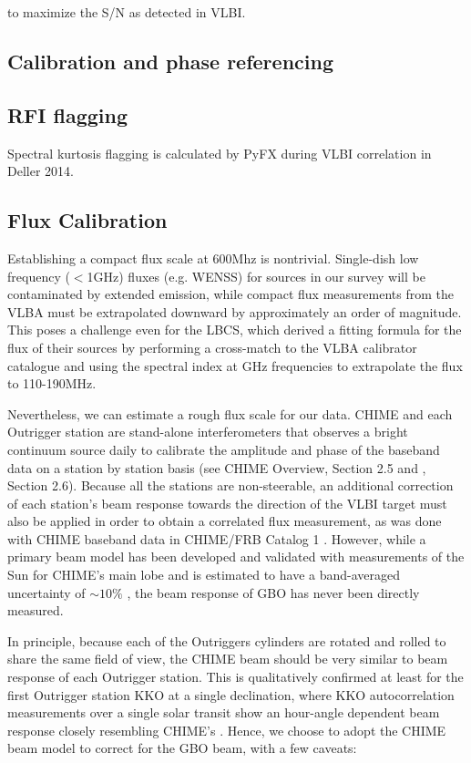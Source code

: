 \documentclass[twocolumn]{aastex631}
\begin{document}
to maximize the S/N as detected in VLBI.


\subsection{Calibration and phase referencing}

\subsection{RFI flagging}
Spectral kurtosis flagging is calculated by PyFX during VLBI correlation in Deller 2014.

\subsection{Flux Calibration}
Establishing a compact flux scale at 600Mhz is nontrivial. Single-dish low frequency ($<$1GHz) fluxes (e.g. WENSS) for sources in our survey will be contaminated by extended emission, while compact flux measurements from the VLBA must be extrapolated downward by approximately an order of magnitude. This poses a challenge even for the LBCS, which derived a fitting formula for the flux of their sources by performing a cross-match to the VLBA calibrator catalogue and using the spectral index at GHz frequencies to extrapolate the flux to 110-190MHz.

Nevertheless, we can estimate a rough flux scale for our data. CHIME and each Outrigger station are stand-alone interferometers that observes a bright continuum source daily to calibrate the amplitude and phase of the baseband data on a station by station basis (see CHIME Overview, Section 2.5 and \cite{kko_adam}, Section 2.6). Because all the stations are non-steerable, an additional correction of each station's beam response towards the direction of the VLBI target must also be applied in order to obtain a correlated flux measurement, as was done with CHIME baseband data in CHIME/FRB Catalog 1 \citep{basecat1}. However, while a primary beam model has been developed and validated with measurements of the Sun for CHIME's main lobe and is estimated to have a band-averaged uncertainty of $\sim 10\%$ \cite{CHIMEFRB_CAT1}, the beam response of GBO has never been directly measured. 

In principle, because each of the Outriggers cylinders are rotated and rolled to share the same field of view, the CHIME beam should be very similar to beam response of each Outrigger station. This is qualitatively confirmed at least for the first Outrigger station KKO at a single declination, where KKO autocorrelation measurements over a single solar transit show an hour-angle dependent beam response closely resembling CHIME's \citep{kko_adam}. Hence, we choose to adopt the CHIME beam model to correct for the GBO beam, with a few caveats:
\end{document}
